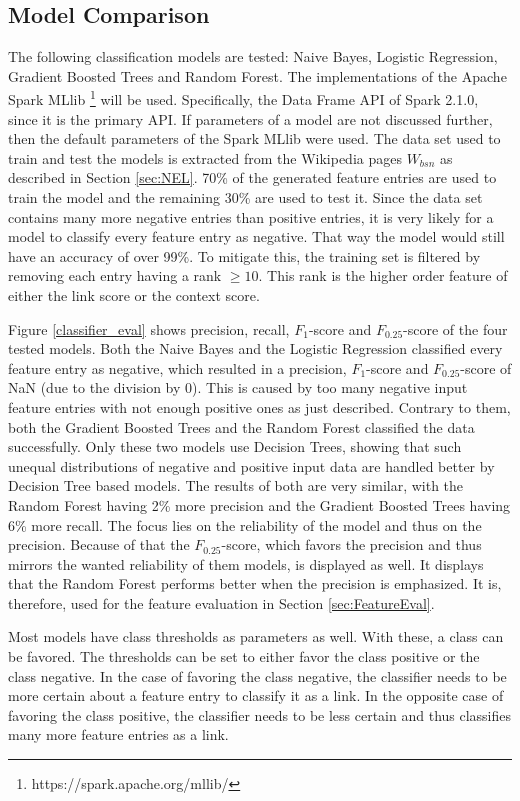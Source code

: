 \subsection{Model Comparison}
The following classification models are tested: Naive Bayes, Logistic Regression, Gradient Boosted Trees and Random Forest. The implementations of the Apache Spark MLlib \footnote{https://spark.apache.org/mllib/} will be used. Specifically, the Data Frame API of Spark 2.1.0, since it is the primary API. If parameters of a model are not discussed further, then the default parameters of the Spark  MLlib were used. The data set used to train and test the models is extracted from the Wikipedia pages $W_{bsn}$ as described in Section \ref{sec:NEL}. 70\% of the generated feature entries are used to train the model and the remaining 30\% are used to test it. Since the data set contains many more negative entries than positive entries, it is very likely for a model to classify every feature entry as negative. That way the model would still have an accuracy of over 99\%. To mitigate this, the training set is filtered by removing each entry having a rank $\geq 10$. This rank is the higher order feature of either the link score or the context score.\par
Figure \ref{classifier_eval} shows precision, recall, $F_1$-score and $F_{0.25}$-score of the four tested models. Both the Naive Bayes and the Logistic Regression classified every feature entry as negative, which resulted in a precision, $F_1$-score and $F_{0.25}$-score of NaN (due to the division by 0). This is caused by too many negative input feature entries with not enough positive ones as just described. Contrary to them, both the Gradient Boosted Trees and the Random Forest classified the data successfully. Only these two models use Decision Trees, showing that such unequal distributions of negative and positive input data are handled better by Decision Tree based models. The results of both are very similar, with the Random Forest having 2\% more precision and the Gradient Boosted Trees having 6\% more recall. The focus lies on the reliability of the model and thus on the precision. Because of that the $F_{0.25}$-score, which favors the precision and thus mirrors the wanted reliability of them models, is displayed as well. It displays that the Random Forest performs better when the precision is emphasized. It is, therefore, used for the feature evaluation in Section \ref{sec:FeatureEval}.\par
Most models have class thresholds as parameters as well. With these, a class can be favored. The thresholds can be set to either favor the class positive or the class negative. In the case of favoring the class negative, the classifier needs to be more certain about a feature entry to classify it as a link. In the opposite case of favoring the class positive, the classifier needs to be less certain and thus classifies many more feature entries as a link.\par
